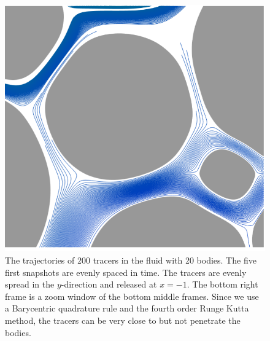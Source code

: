 \documentclass[preprint, 10pt]{elsarticle}
\begin{document}
\begin{figure}[H]
\begin{center}
\includegraphics[width = 0.32 \textwidth]{./figs/tracer_20b270_zoom}
\caption{\label{fig:Eroding20tracer}The trajectories of 200 tracers in
the fluid with 20 bodies. The five first snapshots are evenly spaced in
time.  The tracers are evenly spread in the $y$-direction and released
at $x=-1$. The bottom right frame is a zoom window of the bottom middle
frames.  Since we use a Barycentric quadrature rule and the fourth order
Runge Kutta method, the tracers can be very close to but not penetrate
the bodies.}
\end{center}
\end{figure}
\end{document}
